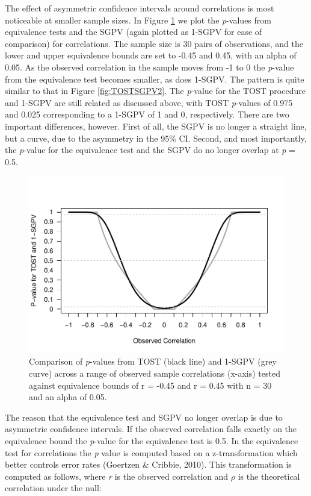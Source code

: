 \documentclass[,man,floatsintext]{apa6}
\begin{document}
The effect of asymmetric confidence intervals around correlations is most noticeable at smaller sample sizes. In Figure \ref{fig:TOSTSGPV11} we plot the \emph{p}-values from equivalence tests and the SGPV (again plotted as 1-SGPV for ease of comparison) for correlations. The sample size is 30 pairs of observations, and the lower and upper equivalence bounds are set to -0.45 and 0.45, with an alpha of 0.05. As the observed correlation in the sample moves from -1 to 0 the \emph{p}-value from the equivalence test becomes smaller, as does 1-SGPV. The pattern is quite similar to that in Figure \ref{fig:TOSTSGPV2}. The \emph{p}-value for the TOST procedure and 1-SGPV are still related as discussed above, with TOST \emph{p}-values of 0.975 and 0.025 corresponding to a 1-SGPV of 1 and 0, respectively. There are two important differences, however. First of all, the SGPV is no longer a straight line, but a curve, due to the asymmetry in the 95\% CI. Second, and most importantly, the \emph{p}-value for the equivalence test and the SGPV do no longer overlap at \emph{p} = 0.5.

\begin{figure}
\centering
\includegraphics{manuscript.R2_files/figure-latex/TOSTSGPV11-1.pdf}
\caption{\label{fig:TOSTSGPV11}Comparison of \emph{p}-values from TOST (black line) and 1-SGPV (grey curve) across a range of observed sample correlations (x-axis) tested against equivalence bounds of r = -0.45 and r = 0.45 with n = 30 and an alpha of 0.05.}
\end{figure}

The reason that the equivalence test and SGPV no longer overlap is due to asymmetric confidence intervals. If the observed correlation falls exactly on the equivalence bound the \emph{p}-value for the equivalence test is 0.5. In the equivalence test for correlations the \emph{p} value is computed based on a z-transformation which better controls error rates (Goertzen \& Cribbie, 2010). This transformation is computed as follows, where \emph{r} is the observed correlation and \(\rho\) is the theoretical correlation under the null:
\end{document}

